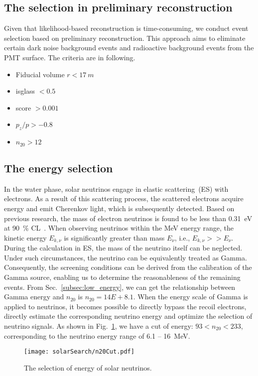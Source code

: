 \subsection{The selection in preliminary reconstruction}
Given that likelihood-based reconstruction is time-consuming, we conduct event selection based on preliminary reconstruction. This approach aims to eliminate certain dark noise background events and radioactive background events from the PMT surface. The criteria are in following.
\begin{itemize}
	\item Fiducial volume $r < \SI{17}{m}$
	\item isglass $< 0.5$
	\item score $>0.001$
	\item $p_z/p>-0.8$
	\item $n_{20}>12$
\end{itemize}

\subsection{The energy selection}
In the water phase, solar neutrinos engage in elastic scattering~(ES) with electrons. As a result of this scattering process, the scattered electrons acquire energy and emit Cherenkov light, which is subsequently detected. Based on previous research, the mass of electron neutrinos is found to be less than \SI{0.31}{eV} at \SI{90}{\%} CL~\cite{KATRIN}. When observing neutrinos within the \si{MeV} energy range, the kinetic energy \(E_{k,\nu}\) is significantly greater than mass \(E_{\nu}\), i.e., \(E_{k,\nu} >> E_{\nu}\). During the calculation in ES, the mass of the neutrino itself can be neglected. Under such circumstances, the neutrino can be equivalently treated as Gamma. Consequently, the screening conditions can be derived from the calibration of the Gamma source, enabling us to determine the reasonableness of the remaining events.
From Sec.~\ref{subsec:low_energy}, we can get the relationship between Gamma energy and $n_{20}$ is $n_{20}=14E+8.1$. When the energy scale of Gamma is applied to neutrinos, it becomes possible to directly bypass the recoil electrons, directly estimate the corresponding neutrino energy and optimize the selection of neutrino signals.
As shown in Fig.~\ref{fig:solar_n20_select}, we have a cut of energy: $93<n_{20}<233$, corresponding to the neutrino energy range of 6.1 -- \SI{16}{MeV}.
\begin{figure}[htbp]
	\centering
	\texttt{[image: solarSearch/n20Cut.pdf]}
	\caption{The selection of energy of solar neutrinos.}
	\label{fig:solar_n20_select}
\end{figure}

